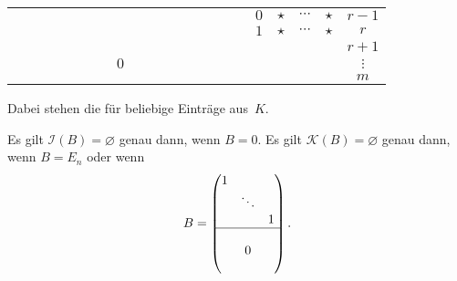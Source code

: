 \documentclass[a4paper]{article}
\begin{document}
\begin{center}
\begin{tabular}{|cccccccccccccccccccc|c}
                                &          &     &                           &         &          &         &                           &         &          &         &                           &         &          &         & \multicolumn{1}{|c}{}         & \multicolumn{1}{|c|}{$0$}      & $\star$  & $\cdots$ & $\star$                 & $r-1$    \\ \cline{16-16}
                                &          &     &                           &         &          &         &                           &         &          &         &                           &         &          &         &                               & \multicolumn{1}{|c|}{$1$}      & $\star$  & $\cdots$ & $\star$                 & $r$      \\ \cline{1-20}
                                &          &     &                           &         &          &         &                           &         &          &         &                           &         &          &         &                               &                                &          &          &                         & $r+1$    \\
                                &          &     &                           &         &          &         & $0$                       &         &          &         &                           &         &          &         &                               &                                &          &          &                         & $\vdots$ \\
                                &          &     &                           &         &          &         &                           &         &          &         &                           &         &          &         &                               &                                &          &          &                         & $m$      \\ \cline{1-20}
    \end{tabular}
\end{center}
Dabei stehen die für beliebige Einträge aus~$K$.

\begin{remark}
    Es gilt $\mathcal{I}(B) = \varnothing$ genau dann, wenn $B = 0$. Es gilt $\mathcal{K}(B) = \varnothing$ genau dann, wenn $B = E_n$ oder wenn
    \begin{equation*}
        B = \begin{pmatrix}
            1 &        &   \\
              & \ddots &   \\
              &        & 1 \\ \hline
              &        &   \\
              & 0      &   \\
              &        &
        \end{pmatrix}.
    \end{equation*}
\end{remark}
\end{document}
